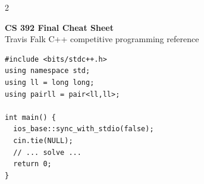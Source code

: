 \documentclass[10pt,letterpaper]{extarticle}
\begin{document}
\begin{multicols*}{2}
\raggedright
\raggedcolumns

\begin{center}
{\Large\bfseries CS 392 Final Cheat Sheet}\\[-1pt]
{\scriptsize Travis Falk \textbullet{} C++ competitive programming reference}
\end{center}

\begin{lstlisting}
#include <bits/stdc++.h>
using namespace std;
using ll = long long;
using pairll = pair<ll,ll>;

int main() {
  ios_base::sync_with_stdio(false);
  cin.tie(NULL);
  // ... solve ...
  return 0;
}
\end{lstlisting}


\end{multicols*}
\end{document}
